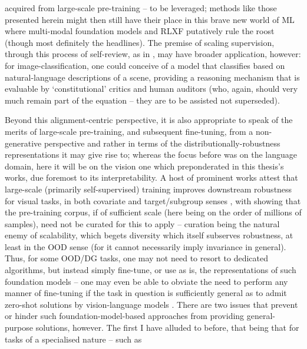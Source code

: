 acquired from large-scale pre-training -- to be leveraged; methods like those presented herein
might then still have their place in this brave new world of ML where multi-modal foundation models
\citep{driess2023palm, huang2023language, openai2023gpt4, katz2023gpt} and RLXF putatively rule the
roost (though most definitely the headlines).
%
The premise of scaling supervision, through this process of self-review, as in
\citet{bai2022constitutional}, may have broader application, however: for image-classification, one
could conceive of a model that classifies based on natural-language descriptions of a scene,
providing a reasoning mechanism that is evaluable by `constitutional' critics and human auditors
(who, again, should very much remain part of the equation -- they are to be assisted not
superseded).
%

%
Beyond this alignment-centric perspective, it is also appropriate to speak of the merits of
large-scale pre-training, and subsequent fine-tuning, from a non-generative perspective and rather
in terms of the distributionally-robustness representations it may give rise to; whereas the focus
before was on the language domain, here it will be on the vision one which preponderated in this
thesis's works, due foremost to its interpretability.
%
A host of prominent works attest that large-scale (primarily self-supervised) training improves
downstream robustness for visual tasks, in both covariate \citep{hendrycks2019using,
hendrycks2020pretrained, radford2021learning} and target/subgroup senses \citep{liu2021self,
goyal2022vision}, with \citet{goyal2022vision} showing that the pre-training corpus, if of
sufficient scale (here being on the order of millions of samples), need not be curated for this to
apply -- curation being the natural enemy of scalability, which begets diversity which itself
subserves robustness, at least in the \ac{OOD} sense (for it cannot  necessarily imply invariance
in general).
%
Thus, for some \ac{OOD}/\ac{DG} tasks, one may not need to resort to dedicated algorithms, but
instead simply fine-tune, or use as is, the representations of such foundation models -- one may
even be able to obviate the need to perform any manner of fine-tuning if the task in question is
sufficiently general as to admit zero-shot solutions by vision-language models
\citep{radford2021learning, alayrac2022flamingo}.
%
There are two issues that prevent or hinder such foundation-model-based approaches from providing
general-purpose solutions, however. 
%
The first I have alluded to before, that being that for tasks of a specialised nature -- such as
